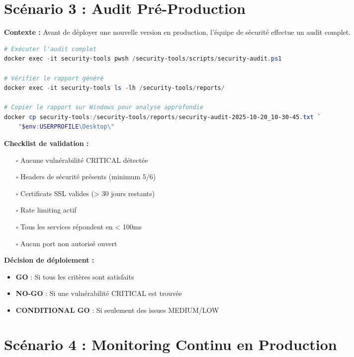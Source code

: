 \documentclass[11pt,a4paper]{report}
\begin{document}
\section{Scénario 3 : Audit Pré-Production}

\textbf{Contexte :} Avant de déployer une nouvelle version en production, l'équipe de sécurité effectue un audit complet.

\begin{lstlisting}[language=PowerShell, caption=Audit de Sécurité Complet]
# Exécuter l'audit complet
docker exec -it security-tools pwsh /security-tools/scripts/security-audit.ps1

# Vérifier le rapport généré
docker exec -it security-tools ls -lh /security-tools/reports/

# Copier le rapport sur Windows pour analyse approfondie
docker cp security-tools:/security-tools/reports/security-audit-2025-10-20_10-30-45.txt `
    "$env:USERPROFILE\Desktop\"
\end{lstlisting}

\textbf{Checklist de validation :}
\begin{itemize}
    \item[$\square$] Aucune vulnérabilité CRITICAL détectée
    \item[$\square$] Headers de sécurité présents (minimum 5/6)
    \item[$\square$] Certificats SSL valides (> 30 jours restants)
    \item[$\square$] Rate limiting actif
    \item[$\square$] Tous les services répondent en < 100ms
    \item[$\square$] Aucun port non autorisé ouvert
\end{itemize}

\textbf{Décision de déploiement :}
\begin{itemize}
    \item \textbf{GO} : Si tous les critères sont satisfaits
    \item \textbf{NO-GO} : Si une vulnérabilité CRITICAL est trouvée
    \item \textbf{CONDITIONAL GO} : Si seulement des issues MEDIUM/LOW
\end{itemize}

\section{Scénario 4 : Monitoring Continu en Production}
\end{document}
